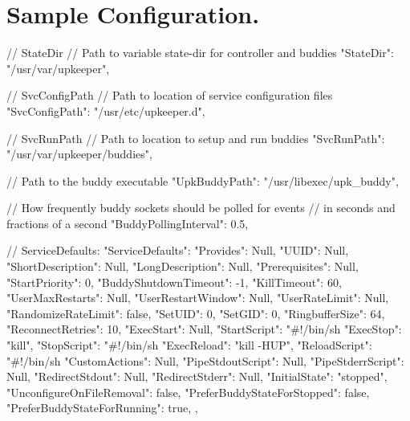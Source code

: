 \section{Sample Configuration.}\label{index_sampleconfig}
\begin{DoxyVerb}
{
    // StateDir
    // Path to variable state-dir for controller and buddies
    "StateDir": "/usr/var/upkeeper",

    // SvcConfigPath
    // Path to location of service configuration files
    "SvcConfigPath": "/usr/etc/upkeeper.d",

    // SvcRunPath
    // Path to location to setup and run buddies
    "SvcRunPath": "/usr/var/upkeeper/buddies",

    // Path to the buddy executable
    "UpkBuddyPath": "/usr/libexec/upk_buddy",

    // How frequently buddy sockets should be polled for events
    // in seconds and fractions of a second
    "BuddyPollingInterval": 0.5,

    // ServiceDefaults:
    "ServiceDefaults": {
        "Provides": Null,
        "UUID": Null,
        "ShortDescription": Null,
        "LongDescription": Null,
        "Prerequisites": Null,
        "StartPriority": 0,
        "BuddyShutdownTimeout": -1,
        "KillTimeout": 60,
        "UserMaxRestarts": Null,
        "UserRestartWindow": Null,
        "UserRateLimit": Null,
        "RandomizeRateLimit": false,
        "SetUID": 0,
        "SetGID": 0,
        "RingbufferSize": 64,
        "ReconnectRetries": 10,
        "ExecStart": Null,
        "StartScript": "#!/bin/sh\nexec %
        "ExecStop": "kill",
        "StopScript": "#!/bin/sh\nexec %
        "ExecReload": "kill -HUP",
        "ReloadScript": "#!/bin/sh\nexec %
        "CustomActions": Null,
        "PipeStdoutScript": Null,
        "PipeStderrScript": Null,
        "RedirectStdout": Null,
        "RedirectStderr": Null,
        "InitialState": "stopped",
        "UnconfigureOnFileRemoval": false,
        "PreferBuddyStateForStopped": false,
        "PreferBuddyStateForRunning": true,
    },
}
\end{DoxyVerb}
 